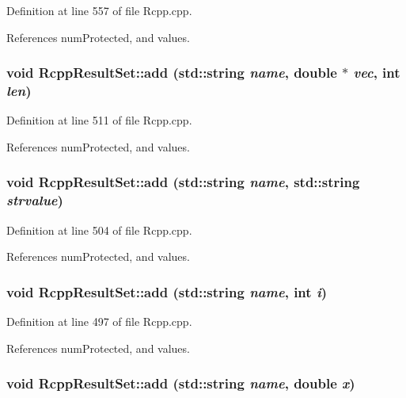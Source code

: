 Definition at line 557 of file Rcpp.cpp.

References numProtected, and values.\hypertarget{classRcppResultSet_5d06d8a4f0497abc6fad4ea22b4934f9}{
\subsubsection[{add}]{\setlength{\rightskip}{0pt plus 5cm}void RcppResultSet::add (std::string {\em name}, \/  double $\ast$ {\em vec}, \/  int {\em len})}}
\label{classRcppResultSet_5d06d8a4f0497abc6fad4ea22b4934f9}




Definition at line 511 of file Rcpp.cpp.

References numProtected, and values.\hypertarget{classRcppResultSet_2633372ab2f50b269e9e26dd7a489492}{
\subsubsection[{add}]{\setlength{\rightskip}{0pt plus 5cm}void RcppResultSet::add (std::string {\em name}, \/  std::string {\em strvalue})}}
\label{classRcppResultSet_2633372ab2f50b269e9e26dd7a489492}




Definition at line 504 of file Rcpp.cpp.

References numProtected, and values.\hypertarget{classRcppResultSet_8b7841ff8a52477b0c6a1fb7c03c0fd9}{
\subsubsection[{add}]{\setlength{\rightskip}{0pt plus 5cm}void RcppResultSet::add (std::string {\em name}, \/  int {\em i})}}
\label{classRcppResultSet_8b7841ff8a52477b0c6a1fb7c03c0fd9}




Definition at line 497 of file Rcpp.cpp.

References numProtected, and values.\hypertarget{classRcppResultSet_7c7da37f18bd352303bf06b7c5233bc4}{
\subsubsection[{add}]{\setlength{\rightskip}{0pt plus 5cm}void RcppResultSet::add (std::string {\em name}, \/  double {\em x})}}
\label{classRcppResultSet_7c7da37f18bd352303bf06b7c5233bc4}




